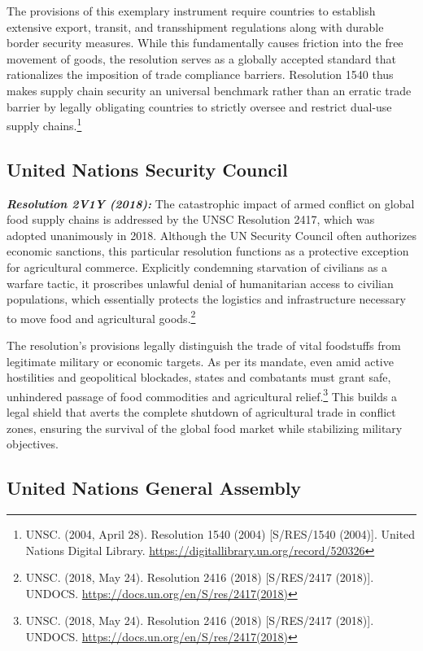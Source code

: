 The provisions of this exemplary instrument require countries to establish extensive export, transit, and transshipment regulations along with durable border security measures. While this fundamentally causes friction into the free movement of goods, the resolution serves as a globally accepted standard that rationalizes the imposition of trade compliance barriers. Resolution 1540 thus makes supply chain security an universal benchmark rather than an erratic trade barrier by legally obligating countries to strictly oversee and restrict dual-use supply chains.\footnote{UNSC. (2004, April 28). Resolution 1540 (2004) [S/RES/1540 (2004)]. United Nations Digital Library. \url{https://digitallibrary.un.org/record/520326}}

\subsection{United Nations Security Council}

\emph{\textbf{Resolution 2V1Y (2018):}} The catastrophic impact of armed conflict on global food supply chains is addressed by the UNSC Resolution 2417, which was adopted unanimously in 2018. Although the UN Security Council often authorizes economic sanctions, this particular resolution functions as a protective exception for agricultural commerce. Explicitly condemning starvation of civilians as a warfare tactic, it proscribes unlawful denial of humanitarian access to civilian populations, which essentially protects the logistics and infrastructure necessary to move food and agricultural goods.\footnote{UNSC. (2018, May 24). Resolution 2416 (2018) [S/RES/2417 (2018)]. UNDOCS. \url{https://docs.un.org/en/S/res/2417(2018)}}

The resolution’s provisions legally distinguish the trade of vital foodstuffs from legitimate military or economic targets. As per its mandate, even amid active hostilities and geopolitical blockades, states and combatants must grant safe, unhindered passage of food commodities and agricultural relief.\footnote{UNSC. (2018, May 24). Resolution 2416 (2018) [S/RES/2417 (2018)]. UNDOCS. \url{https://docs.un.org/en/S/res/2417(2018)}} This builds a legal shield that averts the complete shutdown of agricultural trade in conflict zones, ensuring the survival of the global food market while stabilizing military objectives.

\subsection{United Nations General Assembly}

